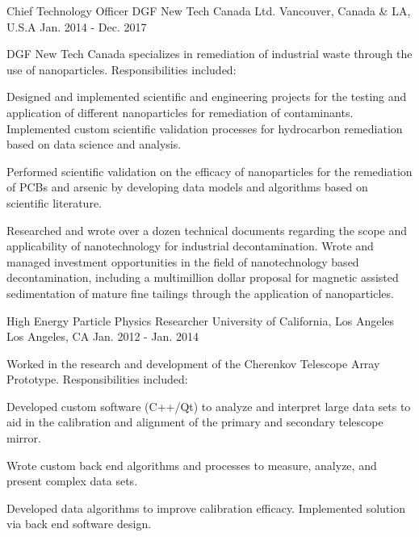 \begin{cventries}
\cventry
{Chief Technology Officer} %
{DGF New Tech Canada Ltd.} %
{Vancouver, Canada \& LA, U.S.A} %
{Jan. 2014 - Dec. 2017} %
{%
\begin{cvitems}
\item[] {DGF New Tech Canada specializes in remediation of industrial waste through the use of nanoparticles. Responsibilities included:} %
\item {Designed and implemented scientific and engineering projects for the testing and application of different nanoparticles for remediation of contaminants. Implemented custom scientific validation processes for hydrocarbon remediation based on data science and analysis.}
\item {Performed scientific validation on the efficacy of nanoparticles for the remediation of PCBs and arsenic by developing data models and algorithms based on scientific literature.}
\item {Researched and wrote over a dozen technical documents regarding the scope and applicability of nanotechnology for industrial decontamination. Wrote and managed investment opportunities in the field of nanotechnology based decontamination, including a multimillion dollar proposal for magnetic assisted sedimentation of mature fine tailings through the application of nanoparticles.}
\end{cvitems}
}


\cventry
{High Energy Particle Physics Researcher} %
{University of California, Los Angeles} %
{Los Angeles, CA} %
{Jan. 2012 - Jan. 2014} %
{%
\begin{cvitems}
\item[] {Worked in the research and development of the Cherenkov Telescope Array Prototype. Responsibilities included:} %
\item {Developed custom software (C++/Qt) to analyze and interpret large data sets to aid in the calibration and alignment of the primary and secondary telescope mirror.}
\item {Wrote custom back end algorithms and processes to measure, analyze, and present complex data sets.}
\item {Developed data algorithms to improve calibration efficacy. Implemented solution via back end software design.}
\end{cvitems}
}


\end{cventries}